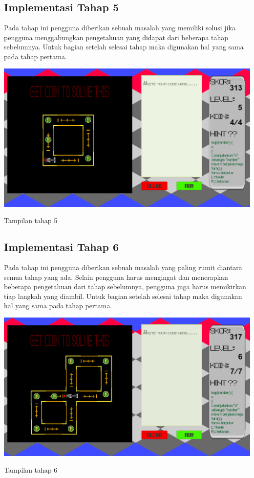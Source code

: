 	\subsection{Implementasi Tahap 5}
	Pada tahap ini pengguna diberikan sebuah masalah yang memiliki solusi jika pengguna menggabungkan pengetahuan yang didapat dari beberapa tahap sebelumnya. Untuk bagian setelah selesai tahap maka digunakan hal yang sama pada tahap pertama.
	\begin{table}
		\centering
		\includegraphics[width=\linewidth-40pt]{pics/prototipe/tahap5}
		\caption{Tampilan tahap 5}
	\end{table}
	\subsection{Implementasi Tahap 6}
	Pada tahap ini pengguna diberikan sebuah masalah yang paling rumit diantara semua tahap yang ada. Selain pengguna harus mengingat dan menerapkan beberapa pengetahuan dari tahap sebelumnya, pengguna juga harus memikirkan tiap langkah yang diambil. Untuk bagian setelah selesai tahap maka digunakan hal yang sama pada tahap pertama.
	\begin{table}
		\centering						
		\includegraphics[width=\linewidth-40pt]{pics/prototipe/tahap6}
		\caption{Tampilan tahap 6}
		
	\end{table}
